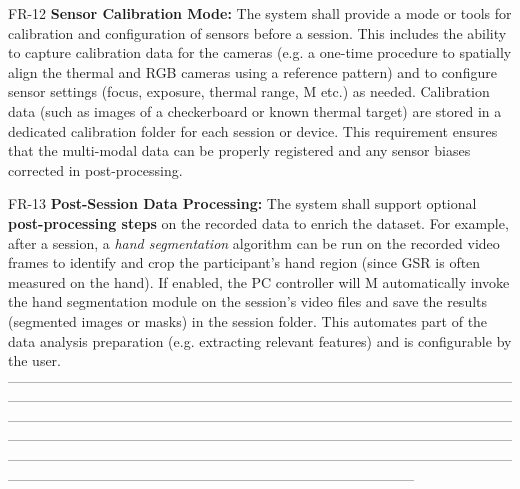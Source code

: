   FR-12                   \textbf{Sensor Calibration Mode:} The system shall provide a mode or tools for calibration and configuration of sensors before a session. This includes the ability to capture calibration data for the cameras (e.g. a one-time procedure to spatially align the thermal and RGB cameras using a reference pattern) and to configure sensor settings (focus, exposure, thermal range,  M
                          etc.) as needed. Calibration data (such as images of a checkerboard or known thermal target) are stored in a dedicated calibration folder for each session or                                                                                                                                                                                                                      
                          device\cite{ref9}\cite{ref10}.   
                          This requirement ensures that the multi-modal data can be properly registered and any sensor biases corrected in post-processing.                                                                                                                                                                                                                                                  

  FR-13                   \textbf{Post-Session Data Processing:} The system shall support optional \textbf{post-processing steps} on the recorded data to enrich the dataset. For example, after a session, a \textit{hand segmentation} algorithm can be run on the recorded video frames to identify and crop the participant's hand region (since GSR is often measured on the hand). If enabled, the PC controller will   M
                          automatically invoke the hand segmentation module on the session's video files and save the results (segmented images or masks) in the session folder\cite{ref11}. This automates part of the data analysis preparation (e.g. extracting relevant 
                          features) and is configurable by the user.                                                                                                                                                                                                                                                                                                                                         
  ---------------------------------------------------------------------------------------------------------------------------------------------------------------------------------------------------------------------------------------------------------------------------------------------------------------------------------------------------------------------------------------------------------------------------------------------------------------------------------------------------------------------------------------------------------------------------------------------------------------------------------------------------

